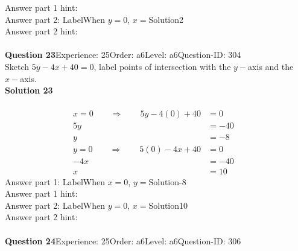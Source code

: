 \documentclass{article}
\begin{document}
Answer part 1 hint: \hspace{15pt}\\
Answer part 2: \hspace{10pt}Label\hspace{10pt}When $y=0$, $x=$\hspace{10pt}Solution\hspace{10pt}2\\
Answer part 2 hint: \hspace{15pt}\\
\\[4pt]
\noindent\textbf{Question 23}\hspace{20pt}Experience: 25\hspace{20pt}Order: a6\hspace{20pt}Level: a6\hspace{20pt}Question-ID: 304\\[2pt]
Sketch $5y-4x+40=0$, label points of intersection with the $y-$axis and the $x-$axis.\\[4pt]
\noindent\textbf{Solution 23}\\[2pt]
\\[-35pt]\begin{align*}
x=0\qquad\Rightarrow\qquad 5y-4(0)+40&=0&\\[2pt]
5y&=-40\\[2pt]
y&=-8\\[12pt]
y=0\qquad\Rightarrow\qquad 5(0)-4x+40&=0&\\[2pt]
-4x&=-40\\[2pt]
x&=10
\end{align*}
Answer part 1: \hspace{10pt}Label\hspace{10pt}When $x=0$, $y=$\hspace{10pt}Solution\hspace{10pt}-8\\
Answer part 1 hint: \hspace{15pt}\\
Answer part 2: \hspace{10pt}Label\hspace{10pt}When $y=0$, $x=$\hspace{10pt}Solution\hspace{10pt}10\\
Answer part 2 hint: \hspace{15pt}\\
\\[4pt]
\noindent\textbf{Question 24}\hspace{20pt}Experience: 25\hspace{20pt}Order: a6\hspace{20pt}Level: a6\hspace{20pt}Question-ID: 306\\[2pt]
\end{document}
